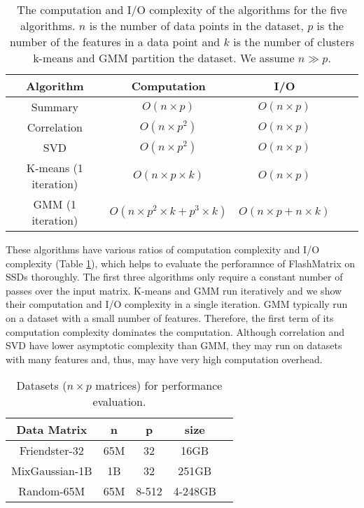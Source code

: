 \begin{table}
\begin{center}
\footnotesize
\begin{tabular}{|c|c|c|c|c|}
\hline
Algorithm & Computation & I/O \\
\hline
Summary & $O(n \times p)$ & $O(n \times p)$ \\
\hline
Correlation & $O(n \times p^2)$ & $O(n \times p)$ \\
\hline
SVD & $O(n \times p^2)$ & $O(n \times p)$ \\
\hline
K-means (1 iteration) & $O(n \times p \times k)$ & $O(n \times p)$ \\
\hline
GMM (1 iteration) & $O(n \times p^2 \times k + p^3 \times k)$ & $O(n \times p + n \times k)$ \\
\hline
\end{tabular}
\normalsize
\end{center}
\caption{The computation and I/O complexity of the algorithms for the five
	algorithms. $n$ is the number of data points in the dataset, $p$ is
	the number of the features in a data point and $k$ is the number of
clusters k-means and GMM partition the dataset. We assume $n \gg p$.}
\label{tbl:algs}
\end{table}

These algorithms have various ratios of computation complexity and I/O complexity
(Table \ref{tbl:algs}), which helps to evaluate the perforamnce of FlashMatrix
on SSDs thoroughly. The first three algorithms only require a constant number
of passes over the input matrix. K-means and GMM run iteratively and we show
their computation and I/O complexity in a single iteration. GMM typically run
on a dataset with a small number of features. Therefore, the first term of its
computation complexity dominates the computation. Although correlation and SVD
have lower asymptotic complexity than GMM, they may run on datasets with many
features and, thus, may have very high computation overhead.

\begin{table}
\begin{center}
\footnotesize
\begin{tabular}{|c|c|c|c|c|}
\hline
Data Matrix & n & p & size \\
\hline
Friendster-32 \cite{friendster} & 65M & 32 & 16GB \\
\hline
MixGaussian-1B & 1B & 32 & 251GB \\
\hline
Random-65M & 65M & 8-512 & 4-248GB \\
\hline
\end{tabular}
\normalsize
\end{center}
\caption{Datasets ($n \times p$ matrices) for performance evaluation.}
\label{tbl:data}
\end{table}

